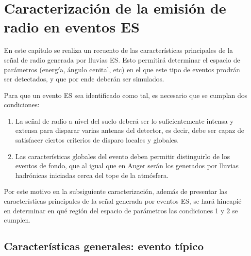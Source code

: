 \chapter{Caracterizaci\'on de la emisi\'on de radio en eventos ES}
\label{ch:caracterizacionRadio}

En este cap\'itulo se realiza un recuento de las caracter\'isticas principales de la se\~nal de radio generada por lluvias ES.
Esto permitir\'a determinar el espacio de par\'ametros (energ\'ia, \'angulo cenital, etc) en el que este tipo de eventos prodr\'an ser detectados, y que por ende deber\'an ser simulados.

Para que un evento ES sea identificado como tal, es necesario que se cumplan dos condiciones:
\begin{enumerate}
 \item La se\~nal de radio a nivel del suelo deber\'a ser lo suficientemente intensa y extensa para disparar varias antenas del detector, es decir, debe ser capaz de satisfacer ciertos criterios de disparo locales y globales.
 \item Las caracter\'isticas globales del evento deben permitir distinguirlo de los eventos de fondo, que al igual que en Auger ser\'an los generados por lluvias hadr\'onicas iniciadas cerca del tope de la atm\'osfera.
\end{enumerate}
Por este motivo en la subsiguiente caracterizaci\'on, adem\'as de presentar las caracter\'isticas principales de la se\~nal generada por eventos ES, se har\'a hincapi\'e en determinar en qu\'e regi\'on del espacio de par\'ametros las condiciones 1 y 2 se cumplen.

	\section{Caracter\'isticas generales: evento típico}
	
